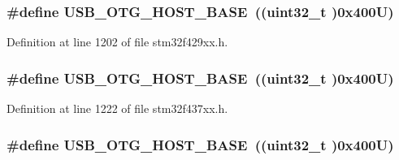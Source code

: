 \subsubsection[{\texorpdfstring{U\+S\+B\+\_\+\+O\+T\+G\+\_\+\+H\+O\+S\+T\+\_\+\+B\+A\+SE}{USB_OTG_HOST_BASE}}]{\setlength{\rightskip}{0pt plus 5cm}\#define U\+S\+B\+\_\+\+O\+T\+G\+\_\+\+H\+O\+S\+T\+\_\+\+B\+A\+SE~((uint32\+\_\+t )0x400\+U)}\hypertarget{group___peripheral__memory__map_ga3bb2dd6c82eefd8587b6146ba36ae071}{}\label{group___peripheral__memory__map_ga3bb2dd6c82eefd8587b6146ba36ae071}


Definition at line 1202 of file stm32f429xx.\+h.

\subsubsection[{\texorpdfstring{U\+S\+B\+\_\+\+O\+T\+G\+\_\+\+H\+O\+S\+T\+\_\+\+B\+A\+SE}{USB_OTG_HOST_BASE}}]{\setlength{\rightskip}{0pt plus 5cm}\#define U\+S\+B\+\_\+\+O\+T\+G\+\_\+\+H\+O\+S\+T\+\_\+\+B\+A\+SE~((uint32\+\_\+t )0x400\+U)}\hypertarget{group___peripheral__memory__map_ga3bb2dd6c82eefd8587b6146ba36ae071}{}\label{group___peripheral__memory__map_ga3bb2dd6c82eefd8587b6146ba36ae071}


Definition at line 1222 of file stm32f437xx.\+h.

\subsubsection[{\texorpdfstring{U\+S\+B\+\_\+\+O\+T\+G\+\_\+\+H\+O\+S\+T\+\_\+\+B\+A\+SE}{USB_OTG_HOST_BASE}}]{\setlength{\rightskip}{0pt plus 5cm}\#define U\+S\+B\+\_\+\+O\+T\+G\+\_\+\+H\+O\+S\+T\+\_\+\+B\+A\+SE~((uint32\+\_\+t )0x400\+U)}\hypertarget{group___peripheral__memory__map_ga3bb2dd6c82eefd8587b6146ba36ae071}{}\label{group___peripheral__memory__map_ga3bb2dd6c82eefd8587b6146ba36ae071}


